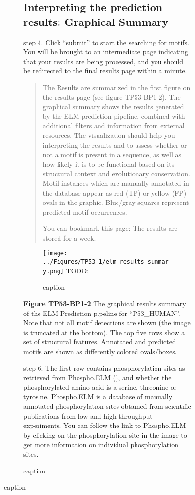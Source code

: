 {\begin{figure}[h!]
{{\begin{figure}[h!]
{{\subsection{Interpreting the prediction results: Graphical
Summary}\label{interpreting-the-prediction-results-graphical-summary}

step 4. Click ``submit'' to start the searching for motifs. You will be
brought to an intermediate page indicating that your results are being
processed, and you should be redirected to the final results page within
a minute.

\begin{quote}
The Results are summarized in the first figure on the results page (see
figure TP53-BP1-2). The graphical summary shows the results generated by
the ELM prediction pipeline, combined with additional filters and
information from external resources. The visualization should help you
interpreting the results and to assess whether or not a motif is present
in a sequence, as well as how likely it is to be functional based on its
structural context and evolutionary conservation. Motif instances which
are manually annotated in the database appear as red (TP) or yellow (FP)
ovals in the graphic. Blue/gray squares represent predicted motif
occurrences.

You can bookmark this page: The results are stored for a week.
\end{quote}

\begin{figure}[h!]
\centering
\texttt{[image: ../Figures/TP53\_1/elm\_results\_summary.png]} TODO:
\caption{
caption
}
\end{figure}

\textbf{Figure TP53-BP1-2} The graphical results summary of the ELM
Prediction pipeline for ``P53\_HUMAN''. Note that not all motif
detections are shown (the image is truncated at the bottom). The top
five rows show a set of structural features. Annotated and predicted
motifs are shown as differently colored ovals/boxes.

step 6. The first row contains phosphorylation sites as retrieved from
Phospho.ELM (\cite{21062810}), and whether the phosphorylated amino acid
is a serine, threonine or tyrosine. Phospho.ELM is a database of
manually annotated phosphorylation sites obtained from scientific
publications from low and high-throughput experiments. You can follow
the link to Phospho.ELM by clicking on the phosphorylation site in the
image to get more information on individual phosphorylation sites.

}}
\end{figure}}}
\end{figure}}
